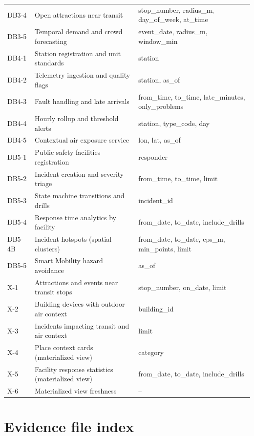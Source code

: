 \documentclass[11pt,a4paper]{article}
\begin{document}
\begin{xltabular}{\linewidth}{@{}p{1.45cm}Xp{5.6cm}@{}}
DB3-4 & Open attractions near transit & stop\_number, radius\_m, day\_of\_week, at\_time \\
DB3-5 & Temporal demand and crowd forecasting & event\_date, radius\_m, window\_min \\
DB4-1 & Station registration and unit standards & station \\
DB4-2 & Telemetry ingestion and quality flags & station, as\_of \\
DB4-3 & Fault handling and late arrivals & from\_time, to\_time, late\_minutes, only\_problems \\
DB4-4 & Hourly rollup and threshold alerts & station, type\_code, day \\
DB4-5 & Contextual air exposure service & lon, lat, as\_of \\
DB5-1 & Public safety facilities registration & responder \\
DB5-2 & Incident creation and severity triage & from\_time, to\_time, limit \\
DB5-3 & State machine transitions and drills & incident\_id \\
DB5-4 & Response time analytics by facility & from\_date, to\_date, include\_drills \\
DB5-4B & Incident hotspots (spatial clusters) & from\_date, to\_date, eps\_m, min\_points, limit \\
DB5-5 & Smart Mobility hazard avoidance & as\_of \\
X-1 & Attractions and events near transit stops & stop\_number, on\_date, limit \\
X-2 & Building devices with outdoor air context & building\_id \\
X-3 & Incidents impacting transit and air context & limit \\
X-4 & Place context cards (materialized view) & category \\
X-5 & Facility response statistics (materialized view) & from\_date, to\_date, include\_drills \\
X-6 & Materialized view freshness & -- \\
\end{xltabular}
\endgroup

\section{Evidence file index}\label{app:files}
\end{document}
